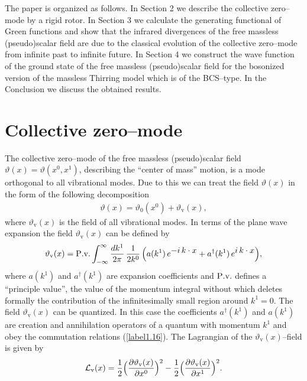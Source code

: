 \documentclass[a4paper,12pt] {article}
\begin{document}
The paper is organized as follows. In Section 2 we describe the
collective zero--mode by a rigid rotor. In Section 3 we calculate the
generating functional of Green functions and show that the infrared
divergences of the free massless (pseudo)scalar field are due to the
classical evolution of the collective zero--mode from infinite past to
infinite future. In Section 4 we construct the wave function of the
ground state of the free massless (pseudo)scalar field for the
bosonized version of the massless Thirring model which is of the
BCS--type.  In the Conclusion we discuss the obtained results.

\section{Collective zero--mode}
\setcounter{equation}{0}

\hspace{0.2in} The collective zero--mode of the free massless
(pseudo)scalar field $\vartheta(x) = \vartheta(x^0,x^1)$, describing
the ``center of mass'' motion, is a mode orthogonal to all vibrational
modes. Due to this we can treat the field $\vartheta(x)$ in the form
of the following decomposition
%
\begin{eqnarray}\label{label2.1}
\vartheta(x) = \vartheta_0(x^0) + \vartheta_{\mathrm v}(x) ,
\end{eqnarray}
%
where $\vartheta_{\mathrm v}(x)$ is the field of all vibrational modes. In terms of
the plane wave expansion the field $\vartheta_{\mathrm v}(x)$ can be defined by
%
\begin{eqnarray}\label{label2.2}
\vartheta_{\mathrm v}(x) = {\rm
P.v.}\int^{\infty}_{-\infty}\frac{dk^1}{2\pi}\,\frac{1}{2k^0}\,
\Big(a(k^1)\,e^{\textstyle -i\,k\cdot x} +
a^{\dagger}(k^1)\,e^{\textstyle i\,k\cdot x}\Big),
\end{eqnarray}
%
where $a(k^1)$ and $a^{\dagger}(k^1)$ are expansion coefficients and
${\rm P.v.}$ defines a ``principle value'', the value of the momentum
integral without which deletes formally the contribution of the
infinitesimally small region around $k^1 = 0$. The field $\vartheta_{\mathrm v}(x)$
can be quantized. In this case the coefficients $a^{\dagger}(k^1)$ and
$a(k^1)$ are creation and annihilation operators of a quantum with
momentum $k^1$ and obey the commutation relations
(\ref{label1.16}). The Lagrangian of the $\vartheta_{\mathrm v}(x)$--field is given
by
%
\begin{eqnarray}\label{label2.3}
{\cal L}_{\mathrm v}(x) = \frac{1}{2}\Big(\frac{\partial
\vartheta_{\mathrm v}(x)}{\partial x^0}\Big)^2 - \frac{1}{2}\Big(\frac{\partial
\vartheta_{\mathrm v}(x)}{\partial x^1}\Big)^2.
\end{eqnarray}
\end{document}
